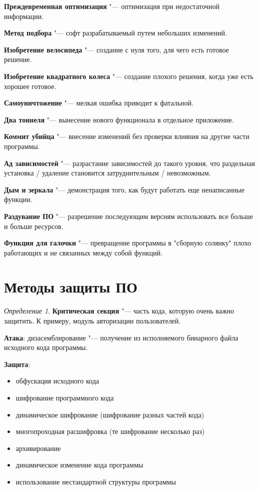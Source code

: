 \documentclass[bachelor, och, pract]{SCWorks}
\theoremstyle{remark}
\newtheorem{definition}{Определение}
\begin{document}
    \textbf{Преждевременная оптимизация} "--- оптимизация при недостаточной информации.

    \textbf{Метод подбора} "--- софт разрабатываемый путем небольших изменений.

    \textbf{Изобретение велосипеда} "--- создание с нуля того, для чего есть готовое решение.

    \textbf{Изобретение квадратного колеса} "--- создание плохого решения, когда уже есть хорошее готовое.

    \textbf{Самоуничтожение} "--- мелкая ошибка приводит к фатальной.

    \textbf{Два тоннеля} "--- вынесение нового функционала в отдельное приложение.

    \textbf{Коммит убийца} "--- внесение изменений без проверки влияния на другие части программы.

    \textbf{Ад зависимостей} "--- разрастание зависимостей до такого уровня, что раздельная установка / удаление становится затруднительным / невозможным.

    \textbf{Дым и зеркала} "--- демонстрация того, как будут работать еще ненаписанные функции.

    \textbf{Раздувание ПО} "--- разрешение последующим версиям использовать все больше и больше ресурсов.

    \textbf{Функция для галочки} "--- превращение программы в "сборную солянку" плохо работающих и не связанных между собой функций.

    \section{Методы защиты ПО}

    \begin{definition}
        \textbf{Критическая секция} "--- часть кода, которую очень важно защитить. К примеру, модуль авторизации пользователей.
    \end{definition}

    \textbf{Атака}: дизасемблирование "--- получение из исполняемого бинарного файла исходного кода программы.  
    
    \textbf{Защита}: 

    \begin{itemize}[label=$\bullet$]
        \item обфускация исходного кода
        \item шифрование программного кода 
        \item динамическое шифрование (шифрование разных частей кода)
        \item многопроходная расшифровка (те шифрование несколько раз)
        \item архивирование 
        \item динамическое изменение кода программы
        \item использование нестандартной структуры программы
    \end{itemize}
    \hfill \break
\end{document}
